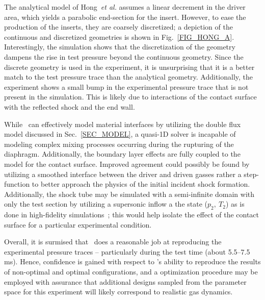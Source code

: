 The analytical model of Hong~\emph{et al.} assumes a linear decrement in the driver area, which yields a parabolic end-section for the insert. However, to ease the production of the inserts, they are coarsely discretized; a depiction of the continuous and discretized geometries is shown in Fig.~\ref{FIG_HONG_A}. Interestingly, the simulation shows that the discretization of the geometry dampens the rise in test pressure beyond the continuous geometry. Since the discrete geometry is used in the experiment, it is unsurprising that it is a better match to the test pressure trace than the analytical geometry. Additionally, the experiment shows a small bump in the experimental pressure trace that is not present in the \stnshk simulation. This is likely due to interactions of the contact surface with the reflected shock and the end wall.
 
 While \stnshk\ can effectively model material interfaces by utilizing the double flux model discussed in Sec.~\ref{SEC_MODEL}, a quasi-1D solver is incapable of modeling complex mixing processes occurring during the rupturing of the diaphragm. Additionally, the boundary layer effects are fully coupled to the model for the contact surface. Improved agreement could possibly be found by utilizing a smoothed interface between the driver and driven gasses rather a step-function to better approach the physics of the initial incident shock formation. Additionally, the shock tube may be simulated with a semi-infinite domain with only the test section by utilizing a supersonic inflow a the state ($p_2,\ T_2$) as is done in high-fidelity simulations~\cite{GROGAN_PCI2015}; this would help isolate the effect of the contact surface for a particular experimental condition.

 Overall, it is surmised that \stnshk\ does a reasonable job at reproducing the experimental pressure traces -- particularly during the test time (about 5.5--7.5 ms). Hence, confidence is gained with respect to \stnshk's ability to reproduce the results of non-optimal and optimal configurations, and a optimization procedure may be employed with assurance that additional designs sampled from the parameter space for this experiment will likely correspond to realistic gas dynamics. 

